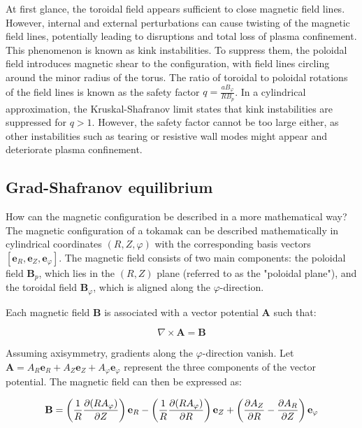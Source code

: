 At first glance, the toroidal field appears sufficient to close magnetic field lines. However, internal and external perturbations can cause twisting of the magnetic field lines, potentially leading to disruptions and total loss of plasma confinement. This phenomenon is known as kink instabilities. To suppress them, the poloidal field introduces magnetic shear to the configuration, with field lines circling around the minor radius of the torus. The ratio of toroidal to poloidal rotations of the field lines is known as the safety factor \( q = \frac{aB_\varphi}{RB_p} \). In a cylindrical approximation, the Kruskal-Shafranov limit \cite{shafranov1956stability, kruskal1958instability} states that kink instabilities are suppressed for \( q > 1 \). However, the safety factor cannot be too large either, as other instabilities such as tearing \cite{furth1973tearing} or resistive wall \cite{fitzpatrick2002simple} modes might appear and deteriorate plasma confinement. \\


\subsection{Grad-Shafranov equilibrium}
\label{sec:intro_GradShafranov}

How can the magnetic configuration be described in a more mathematical way? The magnetic configuration of a tokamak can be described mathematically in cylindrical coordinates \( (R,Z,\varphi) \) with the corresponding basis vectors \([\mathbf{e}_R,\mathbf{e}_Z,\mathbf{e}_\varphi]\). The magnetic field consists of two main components: the poloidal field \(\mathbf{B}_p\), which lies in the \((R,Z)\) plane (referred to as the "poloidal plane"), and the toroidal field \(\mathbf{B}_\varphi\), which is aligned along the \(\varphi\)-direction.

Each magnetic field \(\mathbf{B}\) is associated with a vector potential \(\mathbf{A}\) such that:

\begin{equation}
	\label{eq:intro_magneticVectorPotential}
	\nabla \times \mathbf{A} = \mathbf{B}
\end{equation}

Assuming axisymmetry, gradients along the \(\varphi\)-direction vanish. Let \(\mathbf{A} = A_R \mathbf{e}_R + A_Z \mathbf{e}_Z + A_\varphi \mathbf{e}_\varphi\) represent the three components of the vector potential. The magnetic field can then be expressed as:

\begin{equation}
	\mathbf{B} = \left(\frac{1}{R}\pdv{(RA_\varphi)}{Z}\right)\mathbf{e}_R - \left(\frac{1}{R}\pdv{(RA_\varphi)}{R}\right)\mathbf{e}_Z + \left(\pdv{A_Z}{R} - \pdv{A_R}{Z}\right)\mathbf{e}_\varphi
\end{equation}

